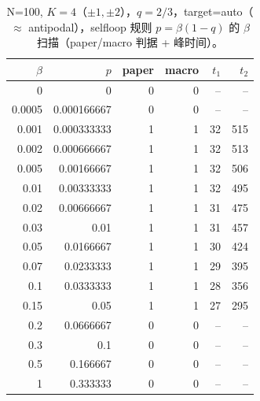 \begin{table}[!htbp]
\centering
\small
\begin{tabular}{rrrrrr}
\toprule
$\beta$ & $p$ & paper & macro & $t_1$ & $t_2$\\
\midrule
0 & 0 & 0 & 0 & -- & --\\
0.0005 & 0.000166667 & 0 & 0 & -- & --\\
0.001 & 0.000333333 & 1 & 1 & 32 & 515\\
0.002 & 0.000666667 & 1 & 1 & 32 & 513\\
0.005 & 0.00166667 & 1 & 1 & 32 & 506\\
0.01 & 0.00333333 & 1 & 1 & 32 & 495\\
0.02 & 0.00666667 & 1 & 1 & 31 & 475\\
0.03 & 0.01 & 1 & 1 & 31 & 457\\
0.05 & 0.0166667 & 1 & 1 & 30 & 424\\
0.07 & 0.0233333 & 1 & 1 & 29 & 395\\
0.1 & 0.0333333 & 1 & 1 & 28 & 356\\
0.15 & 0.05 & 1 & 1 & 27 & 295\\
0.2 & 0.0666667 & 0 & 0 & -- & --\\
0.3 & 0.1 & 0 & 0 & -- & --\\
0.5 & 0.166667 & 0 & 0 & -- & --\\
1 & 0.333333 & 0 & 0 & -- & --\\
\bottomrule
\end{tabular}
\caption{N=100, $K=4$（$\pm 1,\pm 2$），$q=2/3$，target=auto（$\approx$ antipodal），selfloop 规则 $p=\beta(1-q)$ 的 $\beta$ 扫描（paper/macro 判据 + 峰时间）。}
\label{tab:beta-scan-N100-K4}
\end{table}
